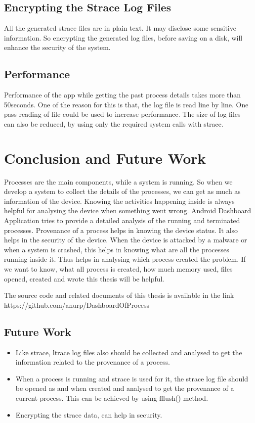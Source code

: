 \documentclass[12pt]{report}
\begin{document}
\section{Encrypting the Strace Log Files}
All the generated strace files are in plain text. It may disclose some sensitive information. So encrypting the generated log files, before saving on a disk, will enhance the security of the system.
\section{Performance}
Performance of the app while getting the past process details takes more than 50seconds. One of the reason for this is that, the log file is read line by line. One pass reading of file could be used to increase performance.
The size of log files can also be reduced, by using only the required system calls with strace. 
\chapter{Conclusion and Future Work}
Processes are the main components, while a system is running. So when we develop a system to collect the details of the processes, we can get as much as information of the device. Knowing the activities happening inside is always helpful for analysing the device when something went wrong. Android Dashboard Application tries to provide a detailed analysis of the running and terminated processes. Provenance of a process helps in knowing the device status. It also helps in the security of the device. When the device is attacked by a malware or when a system is crashed, this helps in knowing what are all the processes running inside it. Thus helps in analysing which process created the problem. If we want to know, what all process is created, how much memory used, files opened, created and wrote this thesis will be helpful. 

The source code and related documents of this thesis is available in the link https://github.com/anurp/DashboardOfProcess

\section{Future Work}
\begin{itemize}
	\item Like strace, ltrace log files also should be collected and analysed to get the information related to the provenance of a process.
	\item When a process is running and strace is used for it, the strace log file should be opened as and when created and analysed to get the provenance of a current process. This can be achieved by using fflush() method. 
	\item Encrypting the strace data, can help in security.
\end{itemize}
\newpage
\appendix
{}
\end{document}

